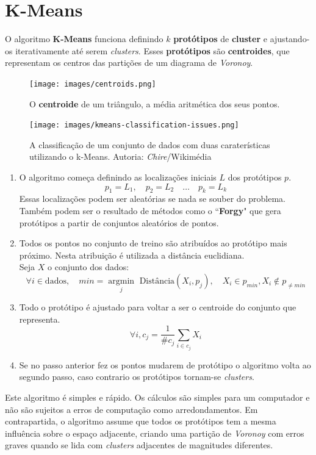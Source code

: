 \documentclass[]{report}
\begin{document}
\section{K-Means}
O algoritmo \textbf{K-Means} funciona definindo $k$ \textbf{protótipos} de \textbf{cluster} e ajustando-os iterativamente até serem \textit{clusters}.
Esses \textbf{protótipos} são \textbf{centroides}, que representam os centros das partições de um diagrama de \textit{Voronoy}.
\begin{figure}
  \vspace{-20pt}
  \begin{center}
    \texttt{[image: images/centroids.png]}
  \end{center}
  \vspace{-20pt}
  \caption{O \textbf{centroide} de um triângulo, a média aritmética dos seus pontos.}
  \vspace{10pt}
  \begin{center}
    \texttt{[image: images/kmeans-classification-issues.png]}
  \end{center}
  \vspace{-20pt}
  \caption{A classificação de um conjunto de dados com duas caraterísticas utilizando o k-Means. Autoria: \textit{Chire}/Wikimédia}
  \vspace{-50pt}
\end{figure}
\begin{enumerate}
\item O algoritmo começa definindo as localizações iniciais $L$ dos protótipos $p$.
$$p_1=L_1,\quad p_2=L_2 \quad \dots \quad p_k = L_k$$
Essas localizações podem ser aleatórias se nada se souber do problema.\\
Também podem ser o resultado de métodos como o ``\textbf{Forgy}" que gera protótipos a partir de conjuntos aleatórios de pontos.
\item Todos os pontos no conjunto de treino são atribuídos ao protótipo mais próximo.
Nesta atribuição é utilizada a distância euclidiana.\\
Seja $X$ o conjunto dos dados:
$$\forall i \in \text{dados},\quad min = \underset{j}{\operatorname{argmin}} \text{ Distância}(X_i, p_j),\quad X_i \in p_{min}, X_i \notin p_{\neq min}$$
\item Todo o protótipo é ajustado para voltar a ser o centroide do conjunto que representa.
$$\forall i, c_j = \frac{1}{\#c_j}\sum_{i \in c_j} X_i$$
\item Se no passo anterior fez os pontos mudarem de protótipo o algoritmo volta ao segundo passo, caso contrario os protótipos tornam-se \textit{clusters}.
\end{enumerate}
Este algoritmo é simples e rápido. Os cálculos são simples para um computador e não são sujeitos a erros de computação como arredondamentos.
Em contrapartida, o algoritmo assume que todos os protótipos tem a mesma influência sobre o espaço adjacente, criando uma partição de \textit{Voronoy} com erros graves quando se lida com \textit{clusters} adjacentes de magnitudes diferentes.
\pagebreak
\end{document}
